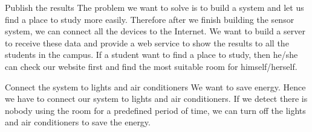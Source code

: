 \documentclass{sig-alternate-ipsn13}
\begin{document}
Publish the results
The problem we want to solve is to build a system and let us find a place to study more easily. Therefore after we finish building the sensor system, we can connect all the devices to the Internet. We want to build a server to receive these data and provide a web service to show the results to all the students in the campus. If a student want to find a place to study, then he/she can check our website first and find the most suitable room for himself/herself.

Connect the system to lights and air conditioners
We want to save energy. Hence we have to connect our system to lights and air conditioners. If we detect there is nobody using the room for a predefined period of time, we can turn off the lights and air conditioners to save the energy.




%

%
%


\end{document}
